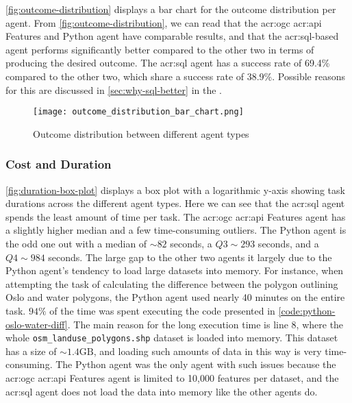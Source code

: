\autoref{fig:outcome-distribution} displays a bar chart for the outcome distribution per agent. From \autoref{fig:outcome-distribution}, we can read that the \acrshort{acr:ogc} \acrshort{acr:api} Features and Python agent have comparable results, and that the \acrshort{acr:sql}-based agent performs significantly better compared to the other two in terms of producing the desired outcome. The \acrshort{acr:sql} agent has a success rate of 69.4\% compared to the other two, which share a success rate of 38.9\%. Possible reasons for this are discussed in \autoref{sec:why-sql-better} in the .

\begin{figure}[htbp]
    \centering
    \texttt{[image: outcome\_distribution\_bar\_chart.png]}
    \caption{Outcome distribution between different agent types}
    \label{fig:outcome-distribution}
\end{figure}

\subsubsection{Cost and Duration}

\autoref{fig:duration-box-plot} displays a box plot with a logarithmic y-axis showing task durations across the different agent types. Here we can see that the \acrshort{acr:sql} agent spends the least amount of time per task. The \acrshort{acr:ogc} \acrshort{acr:api} Features agent has a slightly higher median and a few time-consuming outliers. The Python agent is the odd one out with a median of $\sim 82$ seconds, a $Q3 \sim 293$ seconds, and a $Q4 \sim 984$ seconds. The large gap to the other two agents it largely due to the Python agent's tendency to load large datasets into memory. For instance, when attempting the task of calculating the difference between the polygon outlining Oslo and water polygons, the Python agent used nearly 40 minutes on the entire task. $94\%$ of the time was spent executing the code presented in \autoref{code:python-oslo-water-diff}. The main reason for the long execution time is line 8, where the whole \texttt{osm\_landuse\_polygons.shp} dataset is loaded into memory. This dataset has a size of $\sim 1.4 \text{GB}$, and loading such amounts of data in this way is very time-consuming. The Python agent was the only agent with such issues because the \acrshort{acr:ogc} \acrshort{acr:api} Features agent is limited to 10,000 features per dataset, and the \acrshort{acr:sql} agent does not load the data into memory like the other agents do.

